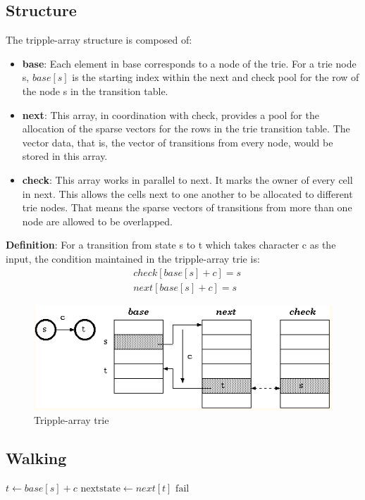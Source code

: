 \documentclass[a4paper, 12pt]{book} %
\begin{document}
\subsection{Structure}
The tripple-array structure is composed of:
\begin{itemize}
	\item \textbf{base}: Each element in base corresponds to a node of the trie. For a trie node s, $base[s]$ is the starting index within the next and check pool for the row of the node s in the transition table. 
	\item \textbf{next}: This array, in coordination with check, provides a pool for the allocation of the sparse vectors for the rows in the trie transition table. The vector data, that is, the vector of transitions from every node, would be stored in this array. 
	\item \textbf{check}: This array works in parallel to next. It marks the owner of every cell in next. This allows the cells next to one another to be allocated to different trie nodes. That means the sparse vectors of transitions from more than one node are allowed to be overlapped.
\end{itemize}
\textbf{Definition}: For a transition from state s to t which takes character c as the input, the condition maintained in the tripple-array trie is:\\
\begin{equation}
\begin{split}
& check[base[s]+c]=s \\
& next[base[s]+c]=s
\end{split}
\end{equation}
\begin{figure}[htpb]
	\centering
	\includegraphics[width=12cm]{figures/tripple_array_trie.png}
	\caption{Tripple-array trie}
	\label{fig:boat1}
\end{figure}
\subsection{Walking}
\begin{algorithmic}
	\STATE $t\gets base[s] + c$
	\STATE $\mathrm{next state}\gets next[t]$
	\ELSE
	\STATE $\mathrm{fail}$
	\ENDIF 
\end{algorithmic}
\end{document}
